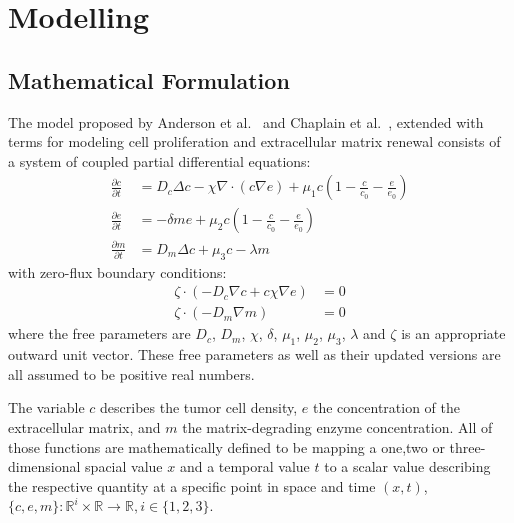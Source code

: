 \section{Modelling}

\subsection{Mathematical Formulation}

The model proposed by Anderson et al.~\cite{anderson_continuous_1998,anderson_mathematical_2000} and Chaplain et al.~\cite{anderson_continuous_1998,chaplain_mathematical_2006-1,franssen_mathematical_2019}, extended with terms for modeling cell proliferation and extracellular matrix renewal consists of a system of coupled partial differential equations: 
\begin{align}
	\frac{\partial c}{\partial t} &= D_c \Delta c - \chi \nabla \cdot (c\nabla e)  + \mu_1 c\left(1-\frac{c}{c_0}-\frac{e}{e_0}\right)\label{eq1}\\
	\frac{\partial e}{\partial t} &= -\delta m e  + \mu_2 c\left(1-\frac{c}{c_0}-\frac{e}{e_0}\right)\label{eq2}\\
	\frac{\partial m}{\partial t} &= D_m \Delta c + \mu_3 c - \lambda m\label{eq3}
\end{align}
with zero-flux boundary conditions:
\begin{align}
	\zeta \cdot  (-D_c \nabla c + c \chi\nabla e) &= 0 \label{eq4}\\
	\zeta \cdot (-D_m\nabla m ) &= 0\label{eq5}
\end{align}
where the free parameters are $D_c$, $D_m$, $\chi$, $\delta$, $\mu_1$, $\mu_2$, $\mu_3$, $\lambda$ and $\zeta$ is an appropriate outward unit vector. These free parameters as well as their updated versions are all assumed to be positive real numbers.

The variable $c$ describes the tumor cell density, $e$ the concentration of the extracellular matrix, and $m$ the matrix-degrading enzyme concentration. All of those functions are mathematically defined to be mapping a one,two or three-dimensional spacial value $x$ and a temporal value $t$ to a scalar value describing the respective quantity at a specific point in space and time $(x,t)$, $\{c,e,m\}: \mathbb{R}^{i} \times \mathbb{R} \rightarrow \mathbb{R}, i \in \{1,2,3\}$.

